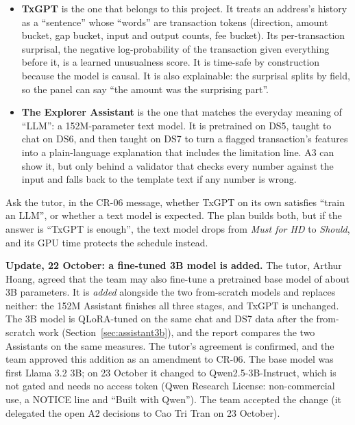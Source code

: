 \begin{itemize}
  \item \textbf{TxGPT} is the one that belongs to this project. It treats an address's history as
    a ``sentence'' whose ``words'' are transaction tokens (direction, amount bucket, gap bucket,
    input and output counts, fee bucket). Its per-transaction surprisal, the negative
    log-probability of the transaction given everything before it, is a learned unusualness
    score. It is time-safe by construction because the model is causal. It is also explainable:
    the surprisal splits by field, so the panel can say ``the amount was the surprising part''.
  \item \textbf{The Explorer Assistant} is the one that matches the everyday meaning of ``LLM'':
    a 152M-parameter text model. It is pretrained on DS5, taught to chat on DS6, and then taught
    on DS7 to turn a flagged transaction's features into a plain-language explanation that
    includes the limitation line. A3 can show it, but only behind a validator that checks every
    number against the input and falls back to the template text if any number is wrong.
\end{itemize}

\begin{team}
Ask the tutor, in the CR-06 message, whether TxGPT on its own satisfies ``train an LLM'', or
whether a text model is expected. The plan builds both, but if the answer is ``TxGPT is enough'',
the text model drops from \emph{Must for HD} to \emph{Should}, and its GPU time protects the
schedule instead.
\end{team}

\textbf{Update, 22 October: a fine-tuned 3B model is added.} The tutor, Arthur Hoang, agreed that
the team may also fine-tune a pretrained base model of about 3B parameters. It is \emph{added}
alongside the two from-scratch models and replaces neither: the 152M Assistant finishes all three
stages, and TxGPT is unchanged. The 3B model is QLoRA-tuned on the same chat and DS7 data after
the from-scratch work (Section~\ref{sec:assistant3b}), and the report compares the two Assistants
on the same measures. The tutor's agreement is confirmed, and the team approved this addition
as an amendment to CR-06. The base model was first Llama 3.2 3B; on 23 October it changed to Qwen2.5-3B-Instruct,
which is not gated and needs no access token (Qwen Research License: non-commercial use, a NOTICE line and
``Built with Qwen''). The team accepted the change (it delegated the open A2 decisions to Cao Tri Tran on 23 October).

